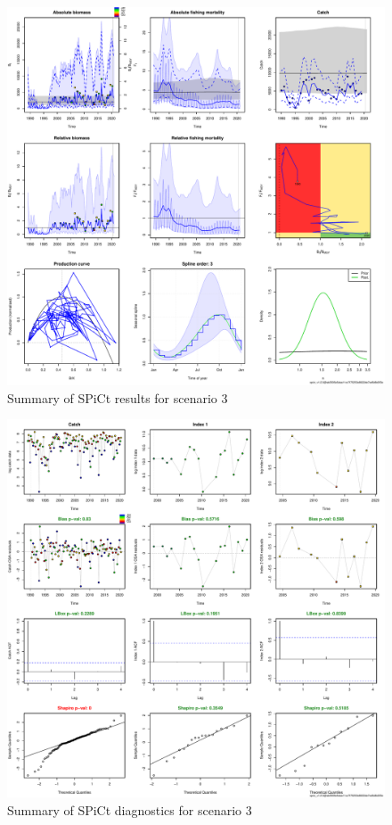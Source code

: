 \documentclass[review]{elsarticle}
\begin{document}
\begin{figure}[h!]
 \centering
 \includegraphics[]{./scenario3out.pdf}
 \caption{Summary of SPiCt results for scenario 3}
 \label{scenario3out}
\end{figure}

\begin{figure}[h!]
 \centering
 \includegraphics[]{./scenario3diag.pdf}
 \caption{Summary of SPiCt diagnostics for scenario 3}
 \label{diag3}
\end{figure}
\clearpage
\end{document}
